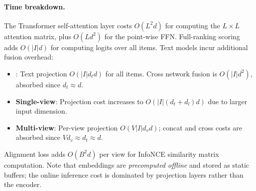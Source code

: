 \paragraph{Time breakdown.}
The Transformer self-attention layer costs $O(L^2d)$ for
computing the $L\times L$ attention matrix, plus $O(Ld^2)$
for the point-wise FFN. Full-ranking scoring adds $O(|I|d)$
for computing logits over all items. Text models incur
additional fusion overhead:
\begin{itemize}[leftmargin=*,itemsep=1pt]
  \item \textbf{\tfidf}: Text projection $O(|I| d_t d)$ for all items.
    Cross network fusion is $O(|I| d^2)$, absorbed since $d_t \approx d$.
  \item \textbf{Single-view}: Projection cost increases to
    $O(|I| (d_t + d_l) d)$ due to larger input dimension.
  \item \textbf{Multi-view}: Per-view projection $O(V |I| d_v d)$;
    concat and cross costs are absorbed since $V d_v \approx d_t \approx d$.
\end{itemize}
Alignment loss adds $O(B^2 d)$ per view for InfoNCE similarity
matrix computation. Note that \llm embeddings are
\emph{precomputed offline} and stored as static buffers; the
online inference cost is dominated by projection layers
rather than the \llm encoder.
